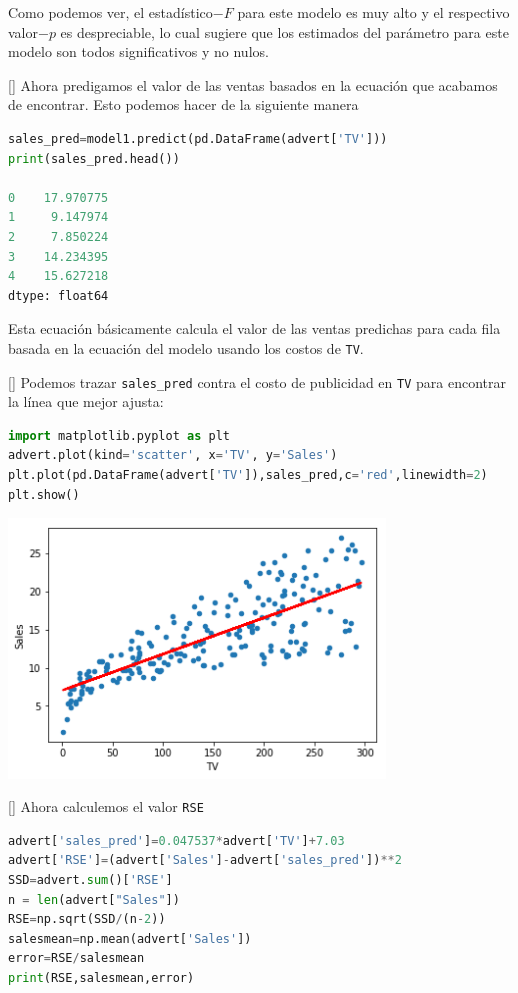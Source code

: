 Como podemos ver, el estadístico$-F$ para este modelo es muy alto y el respectivo valor$-p$ es despreciable, lo cual sugiere que los estimados del parámetro para este modelo son todos significativos y no nulos.

[]{}
Ahora predigamos el valor de las ventas basados en la ecuación que acabamos de encontrar. Esto podemos hacer de la siguiente manera
\begin{lstlisting}[language=Python]
sales_pred=model1.predict(pd.DataFrame(advert['TV']))
print(sales_pred.head())

0    17.970775
1     9.147974
2     7.850224
3    14.234395
4    15.627218
dtype: float64
\end{lstlisting}



Esta ecuación básicamente calcula el valor de las ventas predichas para cada fila basada en la ecuación del modelo usando los costos de \texttt{TV}.

[]{}
Podemos trazar \texttt{sales\_pred} contra el costo de publicidad en \texttt{TV} para encontrar la línea que mejor ajusta:
\begin{lstlisting}[language=Python]
import matplotlib.pyplot as plt
advert.plot(kind='scatter', x='TV', y='Sales')
plt.plot(pd.DataFrame(advert['TV']),sales_pred,c='red',linewidth=2)
plt.show()
\end{lstlisting}



\begin{center}
 \includegraphics[width=10cm,keepaspectratio=true]{./images/statsModelExample.png}
\end{center}


[]
Ahora calculemos el valor \texttt{RSE}
\begin{lstlisting}[language=Python]
advert['sales_pred']=0.047537*advert['TV']+7.03
advert['RSE']=(advert['Sales']-advert['sales_pred'])**2
SSD=advert.sum()['RSE']
n = len(advert["Sales"])
RSE=np.sqrt(SSD/(n-2))
salesmean=np.mean(advert['Sales'])
error=RSE/salesmean
print(RSE,salesmean,error)
\end{lstlisting}


